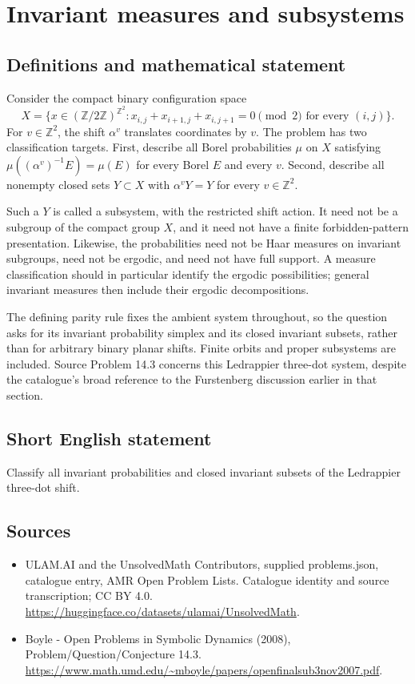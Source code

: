 \documentclass[11pt,a4paper]{article}
\begin{document}
\section*{Invariant measures and subsystems}\label{statement}

\subsection{Definitions and mathematical statement}
Consider the compact binary configuration space
\[
 X=\{x\in(\mathbb Z/2\mathbb Z)^{\mathbb Z^2}:
       x_{i,j}+x_{i+1,j}+x_{i,j+1}=0\pmod2
       \text{ for every }(i,j)\}.
\]
For $v\in\mathbb Z^2$, the shift $\alpha^v$ translates coordinates by
$v$. The problem has two classification targets. First, describe all
Borel probabilities $\mu$ on $X$ satisfying
$\mu((\alpha^v)^{-1}E)=\mu(E)$ for every Borel $E$ and every $v$.
Second, describe all nonempty closed sets $Y\subset X$ with
$\alpha^vY=Y$ for every $v\in\mathbb Z^2$.

Such a $Y$ is called a subsystem, with the restricted shift action.
It need not be a subgroup of the compact group $X$, and it need not
have a finite forbidden-pattern presentation. Likewise, the probabilities
need not be Haar measures on invariant subgroups, need not be ergodic,
and need not have full support. A measure classification should in
particular identify the ergodic possibilities; general invariant measures
then include their ergodic decompositions.

The defining parity rule fixes the ambient system throughout, so the
question asks for its invariant probability simplex and its closed
invariant subsets, rather than for arbitrary binary planar shifts.
Finite orbits and proper subsystems are included. Source Problem 14.3
concerns this Ledrappier three-dot system, despite the catalogue's broad
reference to the Furstenberg discussion earlier in that section.
\subsection{Short English statement}
Classify all invariant probabilities and closed invariant subsets of the Ledrappier three-dot shift.
\subsection{Sources}
\begin{itemize}
\item[S1] ULAM.AI and the UnsolvedMath Contributors, supplied problems.json, catalogue entry, AMR Open Problem Lists. Catalogue identity and source transcription; CC BY 4.0.
\url{https://huggingface.co/datasets/ulamai/UnsolvedMath}.
\item[S2] Boyle - Open Problems in Symbolic Dynamics (2008), Problem/Question/Conjecture 14.3. 
\url{https://www.math.umd.edu/~mboyle/papers/openfinalsub3nov2007.pdf}.
\end{itemize}
\end{document}
